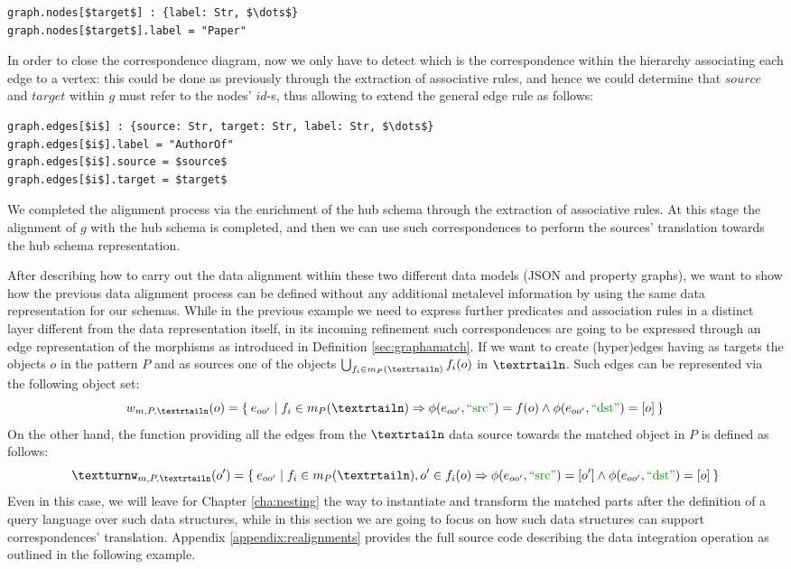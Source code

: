 \begin{example}[label=ex:examplegraphdata]
\begin{lstlisting}[language=theoryjson,basicstyle=\ttfamily\small,mathescape=true]
graph.nodes[$target$] : {label: Str, $\dots$}
graph.nodes[$target$].label = "Paper"
\end{lstlisting}
In order to close the correspondence diagram, now we only have to detect which is the correspondence within the hierarchy associating each edge to a vertex: this could be done as previously through the extraction of associative rules, and hence we could determine that $source$ and $target$ within $g$ must refer to the nodes' $id$-s, thus allowing to extend the general edge rule as follows:
\begin{lstlisting}[language=theoryjson,basicstyle=\ttfamily\small,mathescape=true]
graph.edges[$i$] : {source: Str, target: Str, label: Str, $\dots$}
graph.edges[$i$].label = "AuthorOf"
graph.edges[$i$].source = $source$
graph.edges[$i$].target = $target$
\end{lstlisting}
We completed the alignment process via the enrichment of the hub schema through the extraction of associative rules. At this stage the alignment of $g$ with the hub schema is completed, and then we can use such correspondences to perform the sources' translation towards the hub schema representation. 
\end{example}
 

After describing how to carry out the data alignment within these two different data models (JSON and property graphs), we want to show how the previous data alignment process can be defined without any additional metalevel information by using the same data representation for our schemas. While in the previous example we need to express further predicates and association rules in a distinct layer different from the data representation itself, in its incoming refinement such correspondences are going to be expressed through an edge representation of the morphisms as introduced in Definition \vref{sec:graphamatch}. If we want to create (hyper)edges having as targets the objects $o$ in the pattern $P$ and as sources one of the objects $\bigcup_{f_i\in m_P(\nested)}f_i(o)$ in $\nested$. Such edges can be represented via the following object set:
\[w_{m,P,\nested}(o)=\Set{e_{oo'}|f_i\in m_P(\nested)\Rightarrow\phi(e_{oo'},\SRC)=f(o)\wedge \phi(e_{oo'},\DST)=[o]}\]
On the other hand, the function providing all the edges from the $\nested$ data source towards the matched object in $P$ is defined as follows:
\[\smatch_{m,P,\nested}(o')=\Set{e_{oo'}|f_i\in m_P(\nested), o'\in f_i(o)\Rightarrow\phi(e_{oo'},\SRC)=[o']\wedge \phi(e_{oo'},\DST)=[o]}\]
Even in this case, we will leave for Chapter \ref{cha:nesting}  the way to instantiate and transform the matched parts after the definition of a query language over such data structures, %
while in this section we are going to focus on how such data structures can support  correspondences' translation. Appendix \vref{appendix:realignments} provides the full source code describing the data integration operation as outlined in the following  example. 

